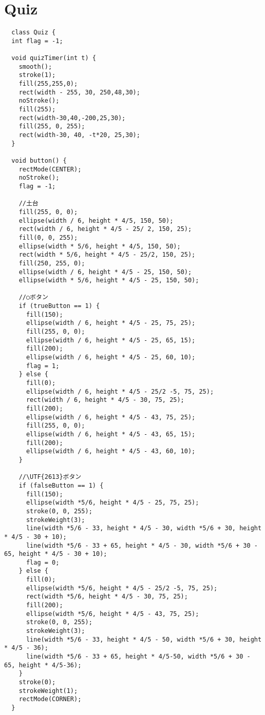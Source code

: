 \documentclass{jsarticle}
\begin{document}
\section{Quiz}
\begin{tiny}
  \begin{lstlisting}
  class Quiz {
  int flag = -1;

  void quizTimer(int t) {
    smooth();
    stroke(1);
    fill(255,255,0);
    rect(width - 255, 30, 250,48,30);
    noStroke();
    fill(255);
    rect(width-30,40,-200,25,30);
    fill(255, 0, 255);
    rect(width-30, 40, -t*20, 25,30);
  }

  void button() {
    rectMode(CENTER);
    noStroke();
    flag = -1;

    //土台
    fill(255, 0, 0);
    ellipse(width / 6, height * 4/5, 150, 50);
    rect(width / 6, height * 4/5 - 25/ 2, 150, 25);
    fill(0, 0, 255);
    ellipse(width * 5/6, height * 4/5, 150, 50);
    rect(width * 5/6, height * 4/5 - 25/2, 150, 25);
    fill(250, 255, 0);
    ellipse(width / 6, height * 4/5 - 25, 150, 50);
    ellipse(width * 5/6, height * 4/5 - 25, 150, 50);

    //○ボタン
    if (trueButton == 1) {
      fill(150);
      ellipse(width / 6, height * 4/5 - 25, 75, 25);
      fill(255, 0, 0);
      ellipse(width / 6, height * 4/5 - 25, 65, 15);
      fill(200);
      ellipse(width / 6, height * 4/5 - 25, 60, 10);
      flag = 1;
    } else {
      fill(0);
      ellipse(width / 6, height * 4/5 - 25/2 -5, 75, 25);
      rect(width / 6, height * 4/5 - 30, 75, 25);
      fill(200);
      ellipse(width / 6, height * 4/5 - 43, 75, 25);
      fill(255, 0, 0);
      ellipse(width / 6, height * 4/5 - 43, 65, 15);  
      fill(200);
      ellipse(width / 6, height * 4/5 - 43, 60, 10);
    }

    //\UTF{2613}ボタン
    if (falseButton == 1) {
      fill(150);
      ellipse(width *5/6, height * 4/5 - 25, 75, 25);
      stroke(0, 0, 255);
      strokeWeight(3);
      line(width *5/6 - 33, height * 4/5 - 30, width *5/6 + 30, height * 4/5 - 30 + 10);
      line(width *5/6 - 33 + 65, height * 4/5 - 30, width *5/6 + 30 - 65, height * 4/5 - 30 + 10);
      flag = 0;
    } else {
      fill(0);
      ellipse(width *5/6, height * 4/5 - 25/2 -5, 75, 25);
      rect(width *5/6, height * 4/5 - 30, 75, 25);
      fill(200);
      ellipse(width *5/6, height * 4/5 - 43, 75, 25);
      stroke(0, 0, 255);
      strokeWeight(3);
      line(width *5/6 - 33, height * 4/5 - 50, width *5/6 + 30, height * 4/5 - 36);
      line(width *5/6 - 33 + 65, height * 4/5-50, width *5/6 + 30 - 65, height * 4/5-36);
    }
    stroke(0);
    strokeWeight(1);
    rectMode(CORNER);
  }


\end{lstlisting}
\end{tiny}
\end{document}
